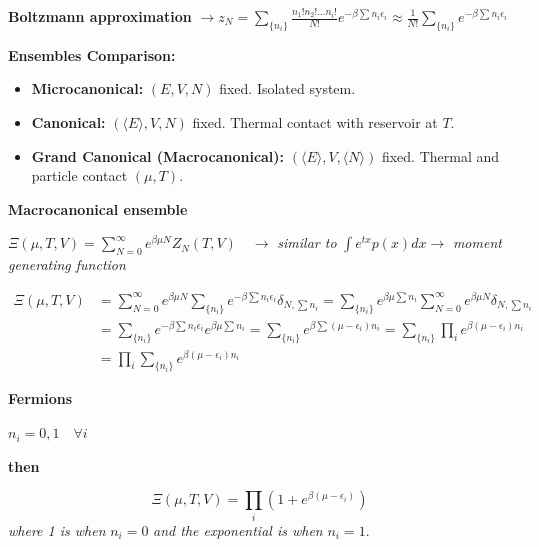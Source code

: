 \documentclass[12pt,a4paper]{report}
\newcommand{\esp}{\vspace{0.5cm}}
\begin{document}
	\esp
	
	\textbf{Boltzmann approximation} $\to z_N = \sum_{\{n_i\}} \frac{n_1! n_2! \dots n_i!}{N!} e^{-\beta \sum n_i \epsilon_i} \approx \frac{1}{N!} \sum_{\{n_i\}} e^{-\beta \sum n_i \epsilon_i}$
	
	\esp
	
	\textbf{Ensembles Comparison:}
	
	\esp
	
	\begin{itemize}
		\item \textbf{Microcanonical:} $(E, V, N)$ fixed. Isolated system.
		\item \textbf{Canonical:} $(\langle E \rangle, V, N)$ fixed. Thermal contact with reservoir at $T$.
		\item \textbf{Grand Canonical (Macrocanonical):} $(\langle E \rangle, V, \langle N \rangle)$ fixed. Thermal and particle contact $(\mu, T)$.
	\end{itemize}
	
	\esp
	
	\noindent \textbf{Macrocanonical ensemble}
	
	\esp
	
	$\Xi(\mu, T, V) = \sum_{N=0}^{\infty} e^{\beta \mu N} Z_N(T, V) \quad \to$ \textit{similar to } $\int e^{tx} p(x) dx \to$ \textit{moment generating function}
	
	\esp
	
	\begin{align*}
		\Xi(\mu, T, V) &= \sum_{N=0}^{\infty} e^{\beta \mu N} \sum_{\{n_i\}} e^{-\beta \sum n_i \epsilon_i} \delta_{N, \sum n_i} = \sum_{\{n_i\}} e^{\beta \mu \sum n_i} \sum_{N=0}^{\infty} e^{\beta \mu N} \delta_{N, \sum n_i} \\
		&= \sum_{\{n_i\}} e^{-\beta \sum n_i \epsilon_i} e^{\beta \mu \sum n_i} = \sum_{\{n_i\}} e^{\beta \sum (\mu - \epsilon_i) n_i} = \sum_{\{n_i\}} \prod_i e^{\beta (\mu - \epsilon_i) n_i} \\
		&= \prod_i \sum_{\{n_i\}} e^{\beta (\mu - \epsilon_i) n_i}
	\end{align*}
	
	\esp
	
	\noindent \textbf{Fermions}
	
	\esp
	
	$n_i = 0, 1 \quad \forall i$
	
	\esp
	
	\noindent \textbf{then}
	
	\esp
	
	\begin{equation}
		\Xi(\mu, T, V) = \prod_i \left( 1 + e^{\beta (\mu - \epsilon_i)} \right)
	\end{equation}
	\textit{where 1 is when } $n_i=0$ \textit{ and the exponential is when } $n_i=1$.
	
\end{document}

